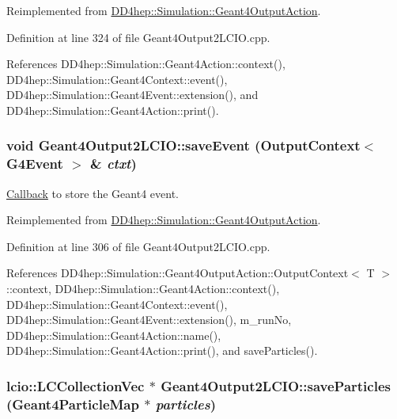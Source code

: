 Reimplemented from \hyperlink{class_d_d4hep_1_1_simulation_1_1_geant4_output_action_aa43d1f01dbcb11ac1d937a878d87a90f}{DD4hep::Simulation::Geant4OutputAction}.

Definition at line 324 of file Geant4Output2LCIO.cpp.

References DD4hep::Simulation::Geant4Action::context(), DD4hep::Simulation::Geant4Context::event(), DD4hep::Simulation::Geant4Event::extension(), and DD4hep::Simulation::Geant4Action::print().\hypertarget{class_d_d4hep_1_1_simulation_1_1_geant4_output2_l_c_i_o_a86749213718dcb1ed4783ab86a374d92}{
\subsubsection[{saveEvent}]{\setlength{\rightskip}{0pt plus 5cm}void Geant4Output2LCIO::saveEvent ({\bf OutputContext}$<$ G4Event $>$ \& {\em ctxt})}}
\label{class_d_d4hep_1_1_simulation_1_1_geant4_output2_l_c_i_o_a86749213718dcb1ed4783ab86a374d92}


\hyperlink{class_d_d4hep_1_1_callback}{Callback} to store the Geant4 event. 

Reimplemented from \hyperlink{class_d_d4hep_1_1_simulation_1_1_geant4_output_action_a660080e931d757573839927ca99bfbed}{DD4hep::Simulation::Geant4OutputAction}.

Definition at line 306 of file Geant4Output2LCIO.cpp.

References DD4hep::Simulation::Geant4OutputAction::OutputContext$<$ T $>$::context, DD4hep::Simulation::Geant4Action::context(), DD4hep::Simulation::Geant4Context::event(), DD4hep::Simulation::Geant4Event::extension(), m\_\-runNo, DD4hep::Simulation::Geant4Action::name(), DD4hep::Simulation::Geant4Action::print(), and saveParticles().\hypertarget{class_d_d4hep_1_1_simulation_1_1_geant4_output2_l_c_i_o_a8c72e4dba5f1d6d5e38ea206e988d418}{
\subsubsection[{saveParticles}]{\setlength{\rightskip}{0pt plus 5cm}lcio::LCCollectionVec $\ast$ Geant4Output2LCIO::saveParticles ({\bf Geant4ParticleMap} $\ast$ {\em particles})}}
\label{class_d_d4hep_1_1_simulation_1_1_geant4_output2_l_c_i_o_a8c72e4dba5f1d6d5e38ea206e988d418}


